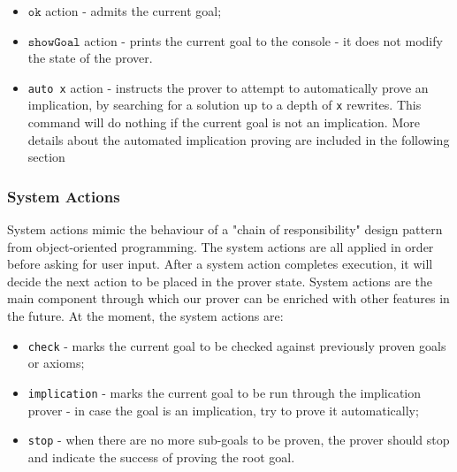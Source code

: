 \documentclass[12pt,a4paper]{article}
\begin{document}
{\begin{itemize}
\begin{itemize}
			\item If the result corresponds to what the prover was expecting, we modify the state by adding the newly generated goals to the \texttt{GoalStack}, by moving down the meta-hierarchy - parsing meta-representation of terms;
			\item The last thing to note is an example of how the rules generate output independent of other applications. In the last field of the \texttt{Prover State}, as \texttt{StagingOutput}, there will be a list of quoted identifiers which will eventually get moved to the loop state and then outputted to the user.
		\end{itemize}
		All other actions which control the application of proof rules are written in a similar manner;
	\item {\(\mathtt{ok}\) action - admits the current goal;}
	\item {\(\mathtt{showGoal}\) action - prints the current goal to the console - it does not modify the state of the prover.}
	\item {\texttt{auto x}} action - instructs the prover to attempt to automatically prove an implication, by searching for a solution up to a depth of \texttt{x} rewrites. This command will do nothing if the current goal is not an implication. More details about the automated implication proving are included in the following section
\end{itemize}
\subsubsection{System Actions}
System actions mimic the behaviour of a "chain of responsibility" design pattern from object-oriented programming. The system actions are all applied in order before asking for user input. After a system action completes execution, it will decide the next action to be placed in the prover state. System actions are the main component through which our prover can be enriched with other features in the future. At the moment, the system actions are:
\begin{itemize}
	\item {\texttt{check}} - marks the current goal to be checked against previously proven goals or axioms;
	\item {\texttt{implication}} - marks the current goal to be run through the implication prover - in case the goal is an implication, try to prove it automatically;
	\item {\texttt{stop}} - when there are no more sub-goals to be proven, the prover should stop and indicate the success of proving the root goal.
\end{itemize}
}
\end{document}
